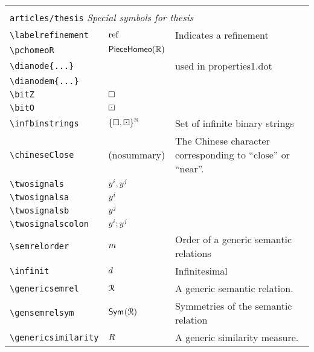 \begin{longtable}{lll}
  &  & \\ 
 \multicolumn{3}{l}{{\color[rgb]{0.5,0.5,0.5}\texttt{articles/thesis}} \emph{Special symbols for thesis}}\\ 
 \hline
{\color[rgb]{0.5,0.5,0.5}\texttt{\textbackslash labelrefinement}} & $\text{ref}$ &  Indicates a refinement\\ 
 {\color[rgb]{0.5,0.5,0.5}\texttt{\textbackslash pchomeoR}} & $\mathsf{PieceHomeo}(\mathbb{R})$ & \\ 
 {\color[rgb]{0.5,0.5,0.5}\texttt{\textbackslash dianode\{...\}}} &  &  used in properties1.dot\\ 
 {\color[rgb]{0.5,0.5,0.5}\texttt{\textbackslash dianodem\{...\}}} &  & \\ 
 {\color[rgb]{0.5,0.5,0.5}\texttt{\textbackslash bitZ}} & $\square$ & \\ 
 {\color[rgb]{0.5,0.5,0.5}\texttt{\textbackslash bitO}} & $\boxdot$ & \\ 
 {\color[rgb]{0.5,0.5,0.5}\texttt{\textbackslash infbinstrings}} & ${\{\square,\boxdot\}^\mathbb{N}}$ &  Set of infinite binary strings\\ 
 {\color[rgb]{0.5,0.5,0.5}\texttt{\textbackslash chineseClose}} & (nosummary) &  The Chinese character corresponding to ``close'' or ``near''. \\ 
 {\color[rgb]{0.5,0.5,0.5}\texttt{\textbackslash twosignals}} & $y^i,y^j$ & \\ 
 {\color[rgb]{0.5,0.5,0.5}\texttt{\textbackslash twosignalsa}} & $y^i$ & \\ 
 {\color[rgb]{0.5,0.5,0.5}\texttt{\textbackslash twosignalsb}} & $y^j$ & \\ 
 {\color[rgb]{0.5,0.5,0.5}\texttt{\textbackslash twosignalscolon}} & $y^i;y^j$ & \\ 
 {\color[rgb]{0.5,0.5,0.5}\texttt{\textbackslash semrelorder}} & $m$ &  Order of a generic semantic relations\\ 
 {\color[rgb]{0.5,0.5,0.5}\texttt{\textbackslash infinit}} & $d$ &  Infinitesimal\\ 
 {\color[rgb]{0.5,0.5,0.5}\texttt{\textbackslash genericsemrel}} & $\mathcal{R}$ &  A generic semantic relation.\\ 
 {\color[rgb]{0.5,0.5,0.5}\texttt{\textbackslash gensemrelsym}} & $\mathsf{Sym}^{}(\mathcal{R})$ &  Symmetries of the semantic relation\\ 
 {\color[rgb]{0.5,0.5,0.5}\texttt{\textbackslash genericsimilarity}} & $R$ &  A generic similarity measure.\\ 

\end{longtable}

